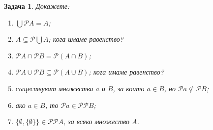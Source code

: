 \documentclass[a4paper]{article}
\newtheorem{problem}{Задача}
\newcommand{\Ps}{\mathscr{P}}
\begin{document}
\begin{problem}
  Докажете:
  \begin{enumerate}
  \item
    $\bigcup\Ps A = A$;
  \item
    $A\subseteq\Ps\bigcup A$; кога имаме равенство?
  \item
    $\Ps A \cap \Ps B = \Ps(A\cap B)$;
  \item
    $\Ps A \cup \Ps B \subseteq\Ps(A\cup B)$; кога имаме равенство?
  \item
    съществуват множества $a$ и $B$, за които $a\in B$, но $\Ps{a}\not\subseteq\Ps{B}$;
  \item
    ако $a\in B$, то $\Ps{a}\in\Ps\Ps{B}$;
  \item
    $\{\emptyset,\{\emptyset\}\} \in \Ps\Ps{A}$, за всяко множество $A$.
  \end{enumerate}
\end{problem}
\end{document}
